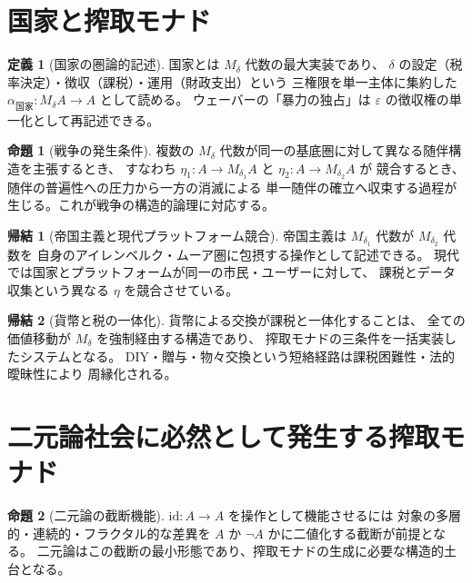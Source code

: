 \documentclass[11pt,a4paper]{ltjsarticle}
\newcommand{\Mdelta}{M_\delta}
\theoremstyle{definition}
\newtheorem{definition}{定義}[section]
\newtheorem{proposition}{命題}[section]
\newtheorem{corollary}{帰結}[section]
\begin{document}
\section{国家と搾取モナド}

\begin{definition}[国家の圏論的記述]
国家とは $\Mdelta$ 代数の最大実装であり、
$\delta$ の設定（税率決定）・徴収（課税）・運用（財政支出）という
三権限を単一主体に集約した $\alpha_{\text{国家}}: \Mdelta A \to A$ として読める。
ウェーバーの「暴力の独占」は $\varepsilon$ の徴収権の単一化として再記述できる。
\end{definition}

\begin{proposition}[戦争の発生条件]
複数の $\Mdelta$ 代数が同一の基底圏に対して異なる随伴構造を主張するとき、
すなわち $\eta_1: A \to M_{\delta_1}A$ と $\eta_2: A \to M_{\delta_2}A$ が
競合するとき、随伴の普遍性への圧力から一方の消滅による
単一随伴の確立へ収束する過程が生じる。これが戦争の構造的論理に対応する。
\end{proposition}

\begin{corollary}[帝国主義と現代プラットフォーム競合]
帝国主義は $M_{\delta_1}$ 代数が $M_{\delta_2}$ 代数を
自身のアイレンベルク・ムーア圏に包摂する操作として記述できる。
現代では国家とプラットフォームが同一の市民・ユーザーに対して、
課税とデータ収集という異なる $\eta$ を競合させている。
\end{corollary}

\begin{corollary}[貨幣と税の一体化]
貨幣による交換が課税と一体化することは、
全ての価値移動が $\Mdelta$ を強制経由する構造であり、
搾取モナドの三条件を一括実装したシステムとなる。
DIY・贈与・物々交換という短絡経路は課税困難性・法的曖昧性により
周縁化される。
\end{corollary}

\section{二元論社会に必然として発生する搾取モナド}

\begin{proposition}[二元論の截断機能]
$\mathrm{id}: A \to A$ を操作として機能させるには
対象の多層的・連続的・フラクタル的な差異を $A$ か $\neg A$ かに二値化する截断が前提となる。
二元論はこの截断の最小形態であり、搾取モナドの生成に必要な構造的土台となる。
\end{proposition}
\end{document}
